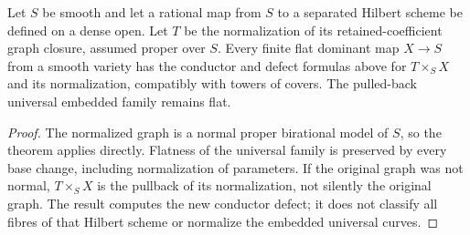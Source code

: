 \begin{corollary}\label{cor:general-hilbert-v171}
Let $S$ be smooth and let a rational map from $S$ to a separated
Hilbert scheme be defined on a dense open. Let $T$ be the normalization
of its retained-coefficient graph closure, assumed proper over $S$.
Every finite flat dominant map $X\to S$ from a smooth variety has the
conductor and defect formulas above for $T\times_S X$ and its
normalization, compatibly with towers of covers. The pulled-back
universal embedded family remains flat.
\end{corollary}
\begin{proof}
The normalized graph is a normal proper birational model of $S$,
so the theorem applies directly. Flatness of the universal family is
preserved by every base change, including normalization of parameters.
If the original graph was not normal, $T\times_S X$ is the pullback
of its normalization, not silently the original graph. The result
computes the new conductor defect; it does not classify all fibres of
that Hilbert scheme or normalize the embedded universal curves.
\end{proof}
